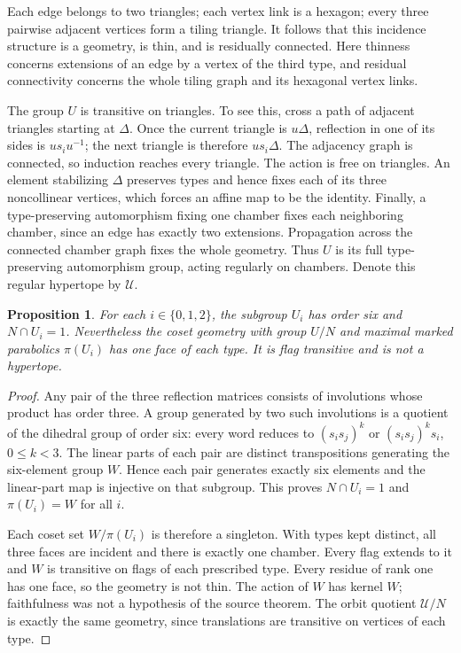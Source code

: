\documentclass[11pt,a4paper]{article}
\newtheorem{proposition}{Proposition}
\begin{document}
Each edge belongs to two triangles; each vertex link is a hexagon;
every three pairwise adjacent vertices form a tiling triangle.
It follows that this incidence structure is a geometry, is thin,
and is residually connected. Here thinness concerns extensions of
an edge by a vertex of the third type, and residual connectivity
concerns the whole tiling graph and its hexagonal vertex links.

The group $U$ is transitive on triangles. To see this, cross a path
of adjacent triangles starting at $\Delta$. Once the current triangle
is $u\Delta$, reflection in one of its sides is $us_iu^{-1}$;
the next triangle is therefore $us_i\Delta$.
The adjacency graph is connected, so induction reaches every triangle.
The action is free on triangles. An element stabilizing $\Delta$
preserves types and hence fixes each of its three noncollinear
vertices, which forces an affine map to be the identity.
Finally, a type-preserving automorphism fixing one chamber fixes each
neighboring chamber, since an edge has exactly two extensions.
Propagation across the connected chamber graph fixes the whole
geometry. Thus $U$ is its full type-preserving automorphism group,
acting regularly on chambers. Denote this regular hypertope by
$\mathcal U$.

\begin{proposition}\label{failure}
For each $i\in\{0,1,2\}$, the subgroup $U_i$ has order six and
$N\cap U_i=1$. Nevertheless the coset geometry with group $U/N$
and maximal marked parabolics $\pi(U_i)$ has one face of each type.
It is flag transitive and is not a hypertope.
\end{proposition}
\begin{proof}
Any pair of the three reflection matrices consists of involutions
whose product has order three. A group generated by two such
involutions is a quotient of the dihedral group of order six:
every word reduces to $(s_is_j)^k$ or $(s_is_j)^ks_i$, $0\leq k<3$.
The linear parts of each pair are distinct transpositions generating
the six-element group $W$. Hence each pair generates exactly six
elements and the linear-part map is injective on that subgroup.
This proves $N\cap U_i=1$ and $\pi(U_i)=W$ for all $i$.

Each coset set $W/\pi(U_i)$ is therefore a singleton. With types
kept distinct, all three faces are incident and there is exactly
one chamber. Every flag extends to it and $W$ is transitive on flags
of each prescribed type. Every residue of rank one has one face,
so the geometry is not thin. The action of $W$ has kernel $W$;
faithfulness was not a hypothesis of the source theorem.
The orbit quotient $\mathcal U/N$ is exactly the same geometry,
since translations are transitive on vertices of each type.
\end{proof}
\end{document}
